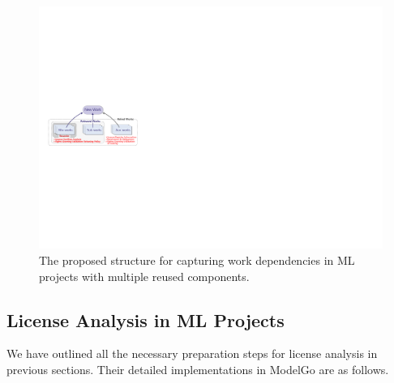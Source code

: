 \begin{figure}[t]
    \centering
    \includegraphics[width=\linewidth]{fig/structure.pdf}
    \caption{The proposed structure for capturing work dependencies in ML projects with multiple reused components.}
    \Description{}
    \label{fig:stru}
    \vspace{-5mm}
\end{figure}

\subsection{License Analysis in ML Projects}

We have outlined all the necessary preparation steps for license analysis in previous sections.
Their detailed implementations in ModelGo are as follows.

